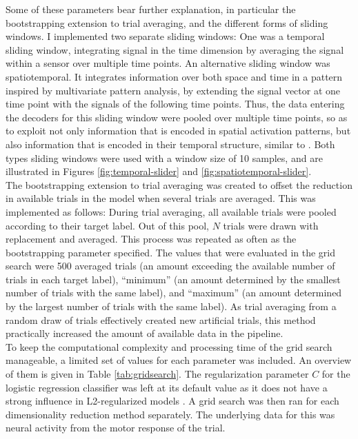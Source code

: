 Some of these parameters bear further explanation, in particular the bootstrapping extension to trial averaging, and the different forms of sliding windows.
I implemented two separate sliding windows: One was a temporal sliding window, integrating signal in the time dimension by averaging the signal within a sensor over multiple time points.
An alternative sliding window was spatiotemporal.
It integrates information over both space and time in a pattern inspired by multivariate pattern analysis, by extending the signal vector at one time point with the signals of the following time points.
Thus, the data entering the decoders for this sliding window were pooled over multiple time points, so as to exploit not only information that is encoded in spatial activation patterns, but also information that is encoded in their temporal structure, similar to \citet{muhle2021hierarchy}.
Both types sliding windows were used with a window size of 10 samples, and are illustrated in Figures \ref{fig:temporal-slider} and \ref{fig:spatiotemporal-slider}.\\
The bootstrapping extension to trial averaging was created to offset the reduction in available trials in the model when several trials are averaged.
This was implemented as follows:
During trial averaging, all available trials were pooled according to their target label.
Out of this pool, $N$ trials were drawn with replacement and averaged.
This process was repeated as often as the bootstrapping parameter specified.
The values that were evaluated in the grid search were 500 averaged trials (an amount exceeding the available number of trials in each target label), ``minimum'' (an amount determined by the smallest number of trials with the same label), and ``maximum'' (an amount determined by the largest number of trials with the same label).
As trial averaging from a random draw of trials effectively created new artificial trials, this method practically increased the amount of available data in the pipeline.\\
To keep the computational complexity and processing time of the grid search manageable, a limited set of values for each parameter was included.
An overview of them is given in Table \ref{tab:gridsearch}.
The regularization parameter $C$ for the logistic regression classifier was left at its default value as it does not have a strong influence in L2-regularized models \citep{VAROQUAUX2017166}.
A grid search was then ran for each dimensionality reduction method separately.
The underlying data for this was neural activity from the motor response of the trial.
